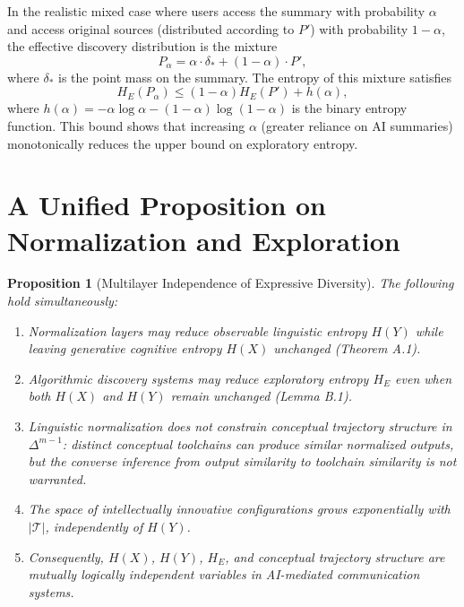 \documentclass[12pt,a4paper]{article}
\theoremstyle{definition}
\theoremstyle{plain}
\newtheorem{proposition}[definition]{Proposition}
\theoremstyle{remark}
\newcommand{\HE}{H_{E}}
\newcommand{\calT}{\mathcal{T}}
\begin{document}
In the realistic mixed case where users access the summary with probability $\alpha$ and
access original sources (distributed according to $P'$) with probability $1 - \alpha$, the
effective discovery distribution is the mixture
\[
P_\alpha = \alpha \cdot \delta_* + (1 - \alpha) \cdot P',
\]
where $\delta_*$ is the point mass on the summary. The entropy of this mixture satisfies
\[
\HE(P_\alpha) \leq (1 - \alpha)\HE(P') + h(\alpha),
\]
where $h(\alpha) = -\alpha \log \alpha - (1-\alpha)\log(1-\alpha)$ is the binary entropy
function. This bound shows that increasing $\alpha$ (greater reliance on AI summaries)
monotonically reduces the upper bound on exploratory entropy.

\section{A Unified Proposition on Normalization and Exploration}
\label{app:unified}

\begin{proposition}[Multilayer Independence of Expressive Diversity]
The following hold simultaneously:

\begin{enumerate}[label=(\roman*)]
\item Normalization layers may reduce observable linguistic entropy $H(Y)$ while leaving
generative cognitive entropy $H(X)$ unchanged (Theorem A.1).

\item Algorithmic discovery systems may reduce exploratory entropy $\HE$ even when both
$H(X)$ and $H(Y)$ remain unchanged (Lemma B.1).

\item Linguistic normalization does not constrain conceptual trajectory structure in
$\Delta^{m-1}$: distinct conceptual toolchains can produce similar normalized outputs,
but the converse inference from output similarity to toolchain similarity is not warranted.

\item The space of intellectually innovative configurations grows exponentially with
$|\calT|$, independently of $H(Y)$.

\item Consequently, $H(X)$, $H(Y)$, $\HE$, and conceptual trajectory structure are
mutually logically independent variables in AI-mediated communication systems.
\end{enumerate}
\end{proposition}
\end{document}
